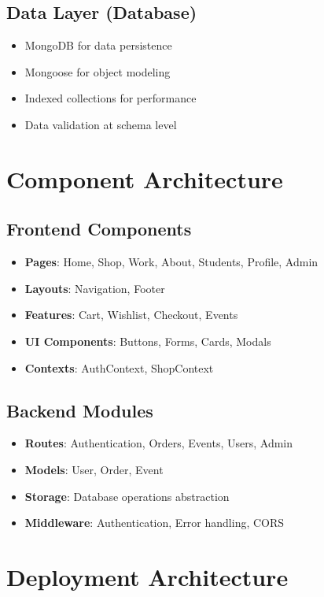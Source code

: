 \documentclass{scrreprt}
\begin{document}
\subsection{Data Layer (Database)}
\begin{itemize}
\item MongoDB for data persistence
\item Mongoose for object modeling
\item Indexed collections for performance
\item Data validation at schema level
\end{itemize}

\section{Component Architecture}

\subsection{Frontend Components}
\begin{itemize}
\item \textbf{Pages}: Home, Shop, Work, About, Students, Profile, Admin
\item \textbf{Layouts}: Navigation, Footer
\item \textbf{Features}: Cart, Wishlist, Checkout, Events
\item \textbf{UI Components}: Buttons, Forms, Cards, Modals
\item \textbf{Contexts}: AuthContext, ShopContext
\end{itemize}

\subsection{Backend Modules}
\begin{itemize}
\item \textbf{Routes}: Authentication, Orders, Events, Users, Admin
\item \textbf{Models}: User, Order, Event
\item \textbf{Storage}: Database operations abstraction
\item \textbf{Middleware}: Authentication, Error handling, CORS
\end{itemize}

\section{Deployment Architecture}
\end{document}
